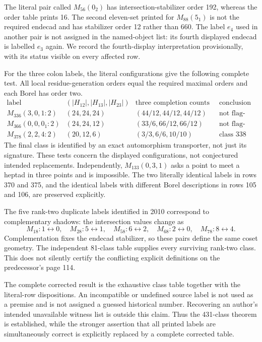 \documentclass[11pt,a4paper]{article}
\begin{document}
The literal pair called $M_{56}(0_2)$ has intersection-stabilizer order 192, whereas the order table prints 16. The second eleven-set printed for $M_{88}(5_1)$ is not the required endecad and has stabilizer order 12 rather than 660. The label $e_4$ used in another pair is not assigned in the named-object list: its fourth displayed endecad is labelled $e_3$ again. We record the fourth-display interpretation provisionally, with its status visible on every affected row.

For the three colon labels, the literal configurations give the following complete test. All local residue-generation orders equal the required maximal orders and each Borel has order two.
\[
\begin{array}{c|c|c|c}
\text{label}&(|H_{12}|,|H_{13}|,|H_{23}|)&
 \text{three completion counts / required}&\text{conclusion}\\\hline
M_{336}(3,0,1:2)&(24,24,24)&(44/12,44/12,44/12)&\text{not flag-transitive}\\
M_{366}(0,0,0_1:2)&(24,24,12)&(33/6,66/12,66/12)&\text{not flag-transitive}\\
M_{378}(2,2,4:2)&(20,12,6)&(3/3,6/6,10/10)&\text{class 338}
\end{array}
\]
The final class is identified by an exact automorphism transporter, not just its signature. These tests concern the displayed configurations, not conjectured intended replacements. Independently, $M_{133}(0,3,1)$ asks a point to meet a heptad in three points and is impossible. The two literally identical labels in rows 370 and 375, and the identical labels with different Borel descriptions in rows 105 and 106, are preserved explicitly.

The five rank-two duplicate labels identified in 2010 correspond to complementary shadows: the intersection values change as
\[
 M_{18}:1\leftrightarrow0,\quad M_{28}:5\leftrightarrow1,\quad
 M_{58}:6\leftrightarrow2,\quad M_{68}:2\leftrightarrow0,\quad
 M_{78}:8\leftrightarrow4.
\]
Complementation fixes the endecad stabilizer, so these pairs define the same coset geometry. The independent 81-class table supplies every surviving rank-two class. This does not silently certify the conflicting explicit definitions on the predecessor's page 114.

The complete corrected result is the exhaustive class table together with the literal-row dispositions. An incompatible or undefined source label is not used as a premise and is not assigned a guessed historical number. Recovering an author's intended unavailable witness list is outside this claim. Thus the 431-class theorem is established, while the stronger assertion that all printed labels are simultaneously correct is explicitly replaced by a complete corrected table.
\end{document}
